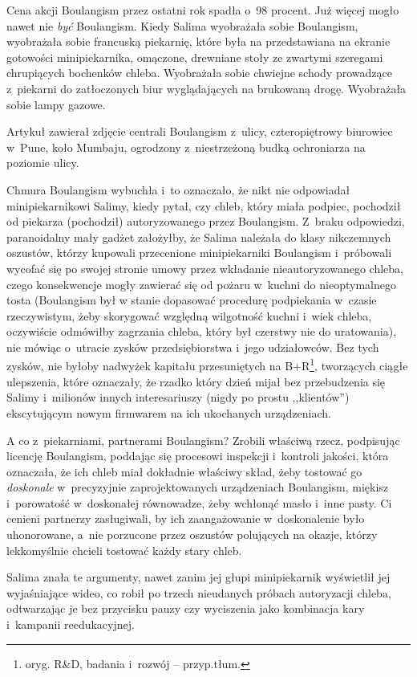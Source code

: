 \documentclass[oneside,polish,11pt,sfheadings]{mwbk}
\begin{document}
Cena akcji Boulangism przez ostatni rok spadła o~98 procent. Już więcej
mogło nawet nie \textit{być} Boulangism. Kiedy Salima wyobrażała sobie
Boulangism, wyobrażała sobie francuską piekarnię, które była na
przedstawiana na ekranie gotowości minipiekarnika, omączone, drewniane
stoły ze zwartymi szeregami chrupiących bochenków chleba. Wyobrażała
sobie chwiejne schody prowadzące z~piekarni do zatłoczonych biur
wyglądających na brukowaną drogę. Wyobrażała sobie lampy gazowe.

Artykuł zawierał zdjęcie centrali Boulangism z~ulicy, czteropiętrowy
biurowiec w~Pune, koło Mumbaju, ogrodzony z~niestrzeżoną budką
ochroniarza na poziomie ulicy.

Chmura Boulangism wybuchła i~to oznaczało, że nikt nie odpowiadał
minipiekarnikowi Salimy, kiedy pytał, czy chleb, który miała podpiec,
pochodził od piekarza (pochodził) autoryzowanego przez Boulangism. Z~braku odpowiedzi, paranoidalny mały gadżet założyłby, że Salima należała
do klasy nikczemnych oszustów, którzy kupowali przecenione
minipiekarniki Boulangism i~próbowali wycofać się po swojej stronie
umowy przez wkładanie nieautoryzowanego chleba, czego konsekwencje mogły
zawierać się od pożaru w~kuchni do nieoptymalnego tosta (Boulangism był
w stanie dopasować procedurę podpiekania w~czasie rzeczywistym, żeby
skorygować względną wilgotność kuchni i~wiek chleba, oczywiście
odmówiłby zagrzania chleba, który był czerstwy nie do uratowania), nie
mówiąc o~utracie zysków przedsiębiorstwa i~jego udziałowców. Bez tych
zysków, nie byłoby nadwyżek kapitału przesuniętych na B+R\footnote{oryg. R\&D,
badania i~rozwój -- przyp.tłum.}, tworzących ciągłe ulepszenia, które
oznaczały, że rzadko który dzień mijał bez przebudzenia się Salimy i~milionów innych interesariuszy (nigdy po prostu ,,klientów'')
ekscytującym nowym firmwarem na ich ukochanych urządzeniach.

A co z~piekarniami, partnerami Boulangism? Zrobili właściwą rzecz,
podpisując licencję Boulangism, poddając się procesowi inspekcji i~kontroli jakości, która oznaczała, że ich chleb miał dokładnie właściwy
skład, żeby tostować go \textit{doskonale} w~precyzyjnie zaprojektowanych
urządzeniach Boulangism, miękisz i~porowatość w~doskonałej równowadze,
żeby wchłonąć masło i~inne pasty. Ci cenieni partnerzy zasługiwali, by
ich zaangażowanie w~doskonalenie było uhonorowane, a~nie porzucone przez
oszustów polujących na okazje, którzy lekkomyślnie chcieli tostować
każdy stary chleb.

Salima znała te argumenty, nawet zanim jej głupi minipiekarnik
wyświetlił jej wyjaśniające wideo, co robił po trzech nieudanych próbach
autoryzacji chleba, odtwarzając je bez przycisku pauzy czy wyciszenia
jako kombinacja kary i~kampanii reedukacyjnej.
\end{document}
